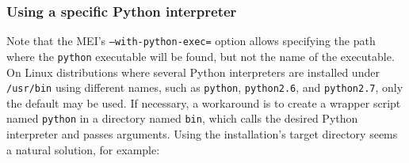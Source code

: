 \documentclass[a4paper,10pt,twoside]{article}
\begin{document}

\subsubsection{Using a specific Python interpreter%
\label{sec:mei:config:examples:python}}

Note that the MEI's \texttt{--with-python-exec=} option allows specifying
the path where the \texttt{python} executable will be found, but
not the name of the executable. On Linux distributions where several
Python interpreters are installed under \texttt{/usr/bin} using
different names, such as \texttt{python}, \texttt{python2.6},
and \texttt{python2.7}, only the default may be used.
If necessary, a workaround is to create a wrapper script named
\texttt{python} in a directory named \texttt{bin}, which
calls the desired Python interpreter and passes arguments.
Using the installation's target directory seems a natural
solution, for example:

\end{document}
